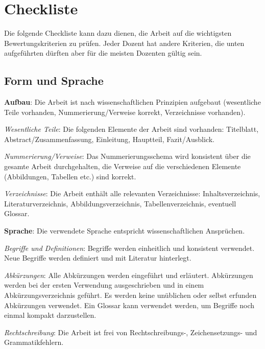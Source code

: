 \chapter{Checkliste}
\label{Kap4}

Die folgende Checkliste kann dazu dienen, die Arbeit auf die wichtigsten Bewertungskriterien zu prüfen. Jeder Dozent hat andere Kriterien, die unten aufgeführten dürften aber für die meisten Dozenten gültig sein.

\section{Form und Sprache}

\begin{checklist}
  \footnotesize
  \item \textbf{Aufbau}: Die Arbeit ist nach wissenschaftlichen Prinzipien aufgebaut (wesentliche Teile vorhanden, Nummerierung/Verweise korrekt, Verzeichnisse vorhanden).
    \begin{checklist}
        \item \textit{Wesentliche Teile}: Die folgenden Elemente der Arbeit sind vorhanden: Titelblatt, Abstract/Zusammenfassung, Einleitung, Hauptteil, Fazit/Ausblick.
        \item \textit{Nummerierung/Verweise}: Das Nummerierungsschema wird konsistent über die gesamte Arbeit durchgehalten, die Verweise auf die verschiedenen Elemente (Abbildungen, Tabellen etc.) sind korrekt.
        \item \textit{Verzeichnisse}: Die Arbeit enthält alle relevanten Verzeichnisse: Inhaltsverzeichnis, Literaturverzeichnis, Abbildungsverzeichnis, Tabellenverzeichnis, eventuell Glossar.
    \end{checklist}
  \item \textbf{Sprache}: Die verwendete Sprache entspricht wissenschaftlichen Ansprüchen.
    \begin{checklist}
        \item \textit{Begriffe und Definitionen}: Begriffe werden einheitlich und konsistent verwendet. Neue Begriffe werden definiert und mit Literatur hinterlegt.
        \item \textit{Abkürzungen}: Alle Abkürzungen werden eingeführt und erläutert. Abkürzungen werden bei der ersten Verwendung ausgeschrieben und in einem Abkürzungsverzeichnis geführt. Es werden keine unüblichen oder selbst erfunden Abkürzungen verwendet. Ein Glossar kann verwendet werden, um Begriffe noch einmal kompakt darzustellen.
        \item \textit{Rechtschreibung}: Die Arbeit ist frei von Rechtschreibungs-, Zeichensetzungs- und Grammatikfehlern.

\end{checklist}
\end{checklist}
